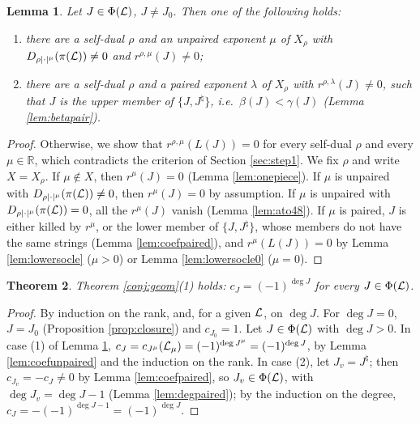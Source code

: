 \documentclass[a4paper,12pt,leqno]{amsart}
\theoremstyle{plain}
\newtheorem{thm}{Theorem}[section]
\newtheorem{lemma}[thm]{Lemma}
\theoremstyle{definition}
\begin{document}
\begin{lemma}\label{lem:reach} Let $J\in\Phi(\mathcal{L})$, $J\neq J_0$. Then one of the following holds:
\begin{enumerate}
\item there are a self-dual $\rho$ and an unpaired exponent $\mu$ of $X_\rho$ with
$D_{\rho|\cdot|^\mu}(\pi(\mathcal{L}))\neq0$ and $r^{\rho,\mu}(J)\neq0$;
\item there are a self-dual $\rho$ and a paired exponent $\lambda$ of $X_\rho$ with $r^{\rho,\lambda}(J)\neq0$, such
that $J$ is the upper member of $\{J,J^\natural\}$, i.e.\ $\beta(J)<\gamma(J)$ (Lemma \ref{lem:betapair}).
\end{enumerate}
\end{lemma}

\begin{proof}
Otherwise, we show that $r^{\rho,\mu}(L(J))=0$ for every self-dual $\rho$ and every $\mu\in\mathbb R$, which
contradicts the criterion of Section \ref{sec:step1}. We fix $\rho$ and write $X=X_\rho$. If $\mu\notin X$, then $r^\mu(J)=0$ (Lemma \ref{lem:onepiece}). If $\mu$ is unpaired
with $D_{\rho|\cdot|^\mu}(\pi(\mathcal{L}))\neq0$, then $r^\mu(J)=0$ by assumption. If $\mu$ is unpaired with
$D_{\rho|\cdot|^\mu}(\pi(\mathcal{L}))=0$, all the $r^\mu(J)$ vanish (Lemma \ref{lem:ato48}). If $\mu$
is paired, $J$ is either killed by $r^\mu$, or the lower member of $\{J,J^\natural\}$, whose members do not
have the same strings (Lemma \ref{lem:coefpaired}), and $r^\mu(L(J))=0$ by
Lemma \ref{lem:lowersocle} ($\mu>0$) or Lemma \ref{lem:lowersocle0} ($\mu=0$).
\end{proof}

\begin{thm}\label{thm:signs} Theorem \ref{conj:geom}(1) holds: $c_J=(-1)^{\deg J}$ for every
$J\in\Phi(\mathcal{L})$.
\end{thm}

\begin{proof}
By induction on the rank, and, for a given $\mathcal{L}$, on $\deg J$. For $\deg J=0$, $J=J_0$ (Proposition
\ref{prop:closure}) and $c_{J_0}=1$. Let $J\in\Phi(\mathcal{L})$ with $\deg J>0$. In case (1) of Lemma
\ref{lem:reach}, $c_J=c_{J^\mu}(\mathcal{L}_\mu)=(-1)^{\deg J^\mu}=(-1)^{\deg J}$, by Lemma \ref{lem:coefunpaired} and
the induction on the rank. In case (2), let $J_v=J^\natural$; then $c_{J_v}=-c_J\neq0$ by Lemma
\ref{lem:coefpaired}, so $J_v\in\Phi(\mathcal{L})$, with $\deg J_v=\deg J-1$ (Lemma \ref{lem:degpaired}); by the
induction on the degree, $c_J=-(-1)^{\deg J-1}=(-1)^{\deg J}$.
\end{proof}
\end{document}
